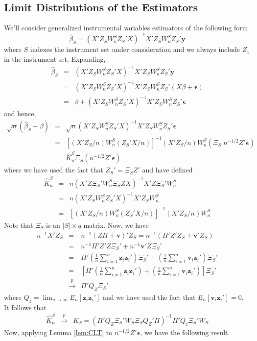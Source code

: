 \documentclass[12pt]{article}
\theoremstyle{definition}
\begin{document}
\subsection{Limit Distributions of the Estimators}
We'll consider generalized instrumental variables estimators of the following form
$$\widehat{\beta}_S = (X'Z_S W^S_n Z_S' X)^{-1}X'Z_S W^S_n Z_S' \mathbf{y}$$
where $S$ indexes the instrument set under consideration and we always include $Z_1$ in the instrument set. Expanding,
  \begin{eqnarray*}
    \widehat{\beta}_S &=& (X'Z_S W^S_n Z_S' X)^{-1}X'Z_S W^S_n Z_S' \mathbf{y}\\
      &=& (X'Z_S W^S_n Z_S' X)^{-1}X'Z_S W^S_nZ_S'(X\beta + \boldsymbol{\epsilon})\\
      &=& \beta +(X'Z_S W^S_n Z_S' X)^{-1}X'Z_S W^S_n Z_S'\boldsymbol{\epsilon}
  \end{eqnarray*}
and hence, 
\begin{eqnarray*}
  \sqrt{n}(\widehat{\beta}_S -\beta) &=& \sqrt{n}(X'Z_S W^S_n Z_S' X)^{-1}X'Z_S W^S_n Z_S'\boldsymbol{\epsilon}\\
      &=& \left[(X'Z_S/n) W^S_n (Z_S' X/n)\right]^{-1}(X'Z_S/n) W^S_n  \left( \Xi_S \; n^{-1/2} Z' \boldsymbol{\epsilon}\right)\\
      &=& \widehat{K}_n^S \Xi_S \left(  n^{-1/2} Z' \boldsymbol{\epsilon}\right)
\end{eqnarray*}
where we have used the fact that $Z_S'  = \Xi_S Z'$ and have defined
  \begin{eqnarray*}
    \widehat{K}_n^S &=& n(X'Z \Xi_S' W^S_n \Xi_S Z X)^{-1}X' Z \Xi_S' W^S_n \\
                    &=& n(X'Z_S W^S_n Z_S' X)^{-1}X'Z_S W^S_n\\
        &=&\left[(X'Z_S/n) W^S_n (Z_S' X/n)\right]^{-1}(X'Z_S/n) W^S_n
  \end{eqnarray*}
Note that $\Xi_S$ is an $|S|\times q$ matrix. Now, we have
  \begin{eqnarray*}
     n^{-1}X' Z_S &=& n^{-1}(Z\Pi + \mathbf{v})' Z_S = n^{-1}\left(\Pi' Z' Z_S + \mathbf{v}' Z_S\right)\\
      &=&n^{-1}\Pi' Z' Z\Xi_S' + n^{-1}\mathbf{v}'Z \Xi_S' \\
      &=& \Pi' \left(\frac{1}{n}\sum_{i=1}^n \mathbf{z}_i  \mathbf{z}_i'\right) \Xi_S' + \left(\frac{1}{n} \sum_{i=1}^n \mathbf{v}_i \mathbf{z}_i' \right)\Xi_S'\\
      &=& \left[ \Pi' \left(\frac{1}{n}\sum_{i=1}^n \mathbf{z}_i  \mathbf{z}_i'\right)  + \left(\frac{1}{n} \sum_{i=1}^n \mathbf{v}_i \mathbf{z}_i' \right)\right]\Xi_S'\\
      &\overset{p}{\rightarrow}& \Pi' Q_Z \Xi_S'
  \end{eqnarray*}
where $Q_z = \lim_{n\rightarrow \infty}E_n[\mathbf{z}_i \mathbf{z}_i']$ and we have used the fact that $E_n[\mathbf{v}_i \mathbf{z}_i'] = 0$. It follows that
  \begin{eqnarray*}
    \widehat{K}_n^S &\overset{p}{\rightarrow}& K_S =   \left(\Pi' Q_Z \Xi_S' W_S \Xi_S Q_Z' \Pi\right)^{-1} \Pi'Q_z \Xi_S'W_S
  \end{eqnarray*}
Now, applying Lemma \ref{lem:CLT} to $n^{-1/2}Z'\boldsymbol{\epsilon}$, we have the following result.
\end{document}
